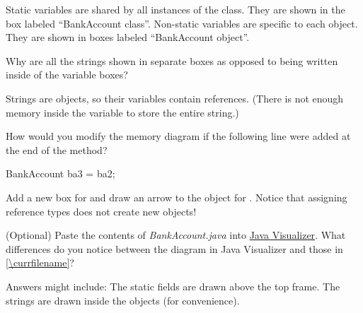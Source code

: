 \begin{answer}[5em]
Static variables are shared by all instances of the class.
They are shown in the box labeled ``BankAccount class''.
Non-static variables are specific to each object.
They are shown in boxes labeled ``BankAccount object''.
\end{answer}


\Q Why are all the strings shown in separate boxes as opposed to being written inside of the variable boxes?

\begin{answer}
Strings are objects, so their variables contain references.
(There is not enough memory inside the variable to store the entire string.)
\end{answer}


\Q How would you modify the memory diagram if the following line were added at the end of the  method?

\begin{javalst}
BankAccount ba3 = ba2;
\end{javalst}

\begin{answer}
Add a new box for  and draw an arrow to the object for .
Notice that assigning reference types does not create new objects!
\end{answer}


\Q (Optional) Paste the contents of \textit{BankAccount.java} into \href{https://cscircles.cemc.uwaterloo.ca/java_visualize/#code=public+class+ClassNameHere+%7B%0A++++public+static+void+main(String%5B%5D+args)+%7B%0A++++++++%0A++++%7D%0A%7D&mode=edit&showStringsAsObjects=1}{Java Visualizer}.
What differences do you notice between the diagram in Java Visualizer and those in \ref{\currfilename}?

\begin{answer}
Answers might include:
\bull The static fields are drawn above the top frame.
\bull The strings are drawn inside the objects (for convenience).
\end{answer}
